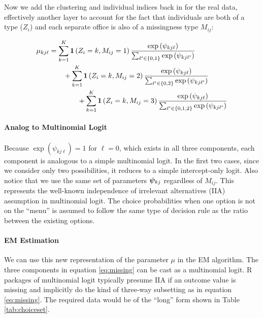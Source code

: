 \documentclass[11pt]{article}
\begin{document}
Now we add the clustering and individual indices back in for the real data, effectively another layer to account for the fact that individuals are both of a type (\(Z_i\)) and each separate office is also of a missingness type \(M_{ij}\):


\begin{align}
\mu_{kj\ell} &= \sum^K_{k=1}\bm{1}\left(Z_i = k, M_{ij}= 1\right)\frac{\exp{(\psi_{kj\ell})}}{\sum_{\ell^\prime \in \{0, 1\}}\exp{(\psi_{kj\ell^\prime})}}\nonumber \\
&\qquad +\sum^K_{k=1}\bm{1}\left(Z_i = k, M_{ij}= 2\right)\frac{\exp{(\psi_{kj\ell})}}{\sum_{\ell^\prime \in \{0, 2\}}\exp{(\psi_{kj\ell^\prime})}}\nonumber \\
&\qquad\qquad +\sum^K_{k=1}\bm{1}\left(Z_i = k, M_{ij}= 3\right)\frac{\exp{(\psi_{kj\ell})}}{\sum_{\ell^\prime \in \{0, 1, 2\}}\exp{(\psi_{kj\ell^\prime})}}\label{eq:missing}
\end{align}



\paragraph{Analog to Multinomial Logit} Because \(\exp(\psi_{kj\ell}) = 1\) for \(\ell = 0\), which exists in all three components, each component is analogous to a simple multinomial logit. In the first two cases, since we consider only two possibilities, it reduces to a simple intercept-only logit. Also notice that we use the same set of parameters \(\bm{\psi}_{kj}\) regardless of \(M_{ij}\). This represents the well-known independence of irrelevant alternatives (IIA) assumption in multinomial logit. The choice probabilities when one option is not on the ``menu'' is assumed to follow the same type of decision rule as the ratio between the existing options.  

\paragraph{EM Estimation} We can use this new representation of the parameter \(\mu\) in the EM algorithm. The three components in equation \ref{eq:missing} can be cast as a multinomial logit. R packages of multinomial logit typically presume IIA if an outcome value is missing and implicitly do the kind of three-way subsetting as in equation \ref{eq:missing}. The required data would be of the ``long'' form shown in Table \ref{tab:choiceset}.
\end{document}
